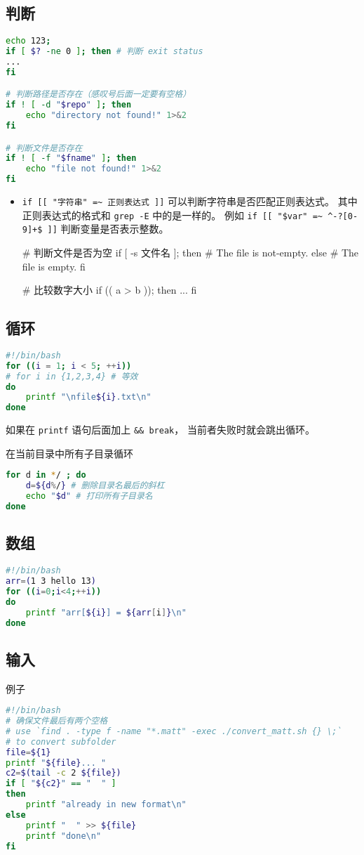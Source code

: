 \subsection{判断}
\begin{lstlisting}[language=bash]
echo 123;
if [ $? -ne 0 ]; then # 判断 exit status
...
fi

# 判断路径是否存在（感叹号后面一定要有空格）
if ! [ -d "$repo" ]; then
    echo "directory not found!" 1>&2
fi

# 判断文件是否存在
if ! [ -f "$fname" ]; then
    echo "file not found!" 1>&2
fi
\end{lstlisting}
\begin{itemize}
\item \verb|if [[ "字符串" =~ 正则表达式 ]]| 可以判断字符串是否匹配正则表达式。 其中正则表达式的格式和 \verb|grep -E| 中的是一样的。 例如 \verb|if [[ "$var" =~ ^-?[0-9]+$ ]]| 判断变量是否表示整数。

# 判断文件是否为空
if [ -s 文件名 ]; then
    # The file is not-empty.
else
    # The file is empty.
fi

# 比较数字大小
if (( a > b )); then
    ...
fi
\end{itemize}

\subsection{循环}
\begin{lstlisting}[language=bash]
#!/bin/bash
for ((i = 1; i < 5; ++i))
# for i in {1,2,3,4} # 等效
do
	printf "\nfile${i}.txt\n"
done
\end{lstlisting}
如果在 \verb|printf| 语句后面加上 \verb|&& break|， 当前者失败时就会跳出循环。

在当前目录中所有子目录循环
\begin{lstlisting}[language=bash]
for d in */ ; do
    d=${d%/} # 删除目录名最后的斜杠
    echo "$d" # 打印所有子目录名
done
\end{lstlisting}

\subsection{数组}
\begin{lstlisting}[language=bash]
#!/bin/bash
arr=(1 3 hello 13)
for ((i=0;i<4;++i))
do
    printf "arr[${i}] = ${arr[i]}\n"
done
\end{lstlisting}


\subsection{输入}
例子
\begin{lstlisting}[language=bash]
#!/bin/bash
# 确保文件最后有两个空格
# use `find . -type f -name "*.matt" -exec ./convert_matt.sh {} \;`
# to convert subfolder
file=${1}
printf "${file}... "
c2=$(tail -c 2 ${file})
if [ "${c2}" == "  " ]
then
	printf "already in new format\n"
else
	printf "  " >> ${file}
	printf "done\n"
fi
\end{lstlisting}

